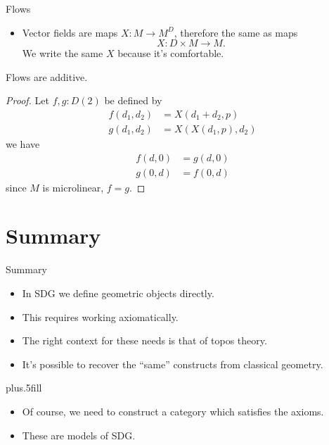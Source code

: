 \documentclass{beamer}
\begin{document}
\begin{frame}{Flows}
  \begin{itemize}
    \item Vector fields are maps \( X:M\to M^D \), therefore the same as maps
      \begin{equation*}
        X: D\times M \to M.
      \end{equation*}
      We write the same \( X \) because it's comfortable.
  \end{itemize}
\end{frame}

\begin{frame}
  \begin{proposition}
    Flows are additive.
  \end{proposition}
  \begin{proof}
    Let \( f,g:D(2) \) be defined by
    \begin{align*}
      f(d_1,d_2) &= X(d_1+d_2,p)\\
      g(d_1,d_2) &= X(X(d_1,p),d_2)
    \end{align*}
    we have
    \begin{align*}
      f(d,0) &= g(d,0)\\
      g(0,d) &= f(0,d)
    \end{align*}
    since \( M \) is microlinear, \( f=g \).
  \end{proof}
\end{frame}



\section*{Summary}

\begin{frame}{Summary}

  \begin{itemize}
  \item
    In SDG we define geometric objects directly.
  \item
    This requires working axiomatically.
  \item
    The right context for these needs is that of topos theory.
  \item 
    It's possible to recover the ``same'' constructs from classical geometry.
  \end{itemize}
  
  \vskip0pt plus.5fill
  \pause
  \begin{itemize}
    \item Of course, we need to construct a category which satisfies the axioms.
    \item These are \alert{models} of SDG.
  \end{itemize}
\end{frame}
\end{document}
